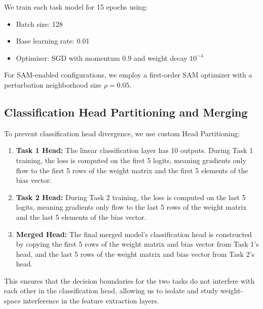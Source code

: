 \documentclass{article}
\theoremstyle{plain}
\theoremstyle{definition}
\theoremstyle{remark}
\begin{document}
We train each task model for 15 epochs using:
\begin{itemize}
  \item Batch size: 128
  \item Base learning rate: 0.01
  \item Optimizer: SGD with momentum 0.9 and weight decay $10^{-4}$
\end{itemize}
For SAM-enabled configurations, we employ a first-order SAM optimizer with a perturbation neighborhood size $\rho = 0.05$.

\subsection{Classification Head Partitioning and Merging}
To prevent classification head divergence, we use custom Head Partitioning:
\begin{enumerate}
  \item \textbf{Task 1 Head:} The linear classification layer has 10 outputs. During Task 1 training, the loss is computed on the first 5 logits, meaning gradients only flow to the first 5 rows of the weight matrix and the first 5 elements of the bias vector.
  \item \textbf{Task 2 Head:} During Task 2 training, the loss is computed on the last 5 logits, meaning gradients only flow to the last 5 rows of the weight matrix and the last 5 elements of the bias vector.
  \item \textbf{Merged Head:} The final merged model's classification head is constructed by copying the first 5 rows of the weight matrix and bias vector from Task 1's head, and the last 5 rows of the weight matrix and bias vector from Task 2's head.
\end{enumerate}
This ensures that the decision boundaries for the two tasks do not interfere with each other in the classification head, allowing us to isolate and study weight-space interference in the feature extraction layers.
\end{document}
